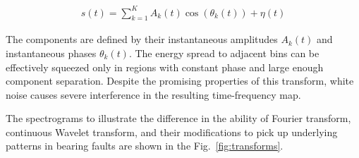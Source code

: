 \begin{ceqn}\begin{align}
s(t) = \sum_{k=1}^{K} A_k(t)\cos(\theta_k(t)) + \eta(t)
\label{equ:sst-transform}
\end{align}\end{ceqn}

The components are defined by their instantaneous amplitudes $A_k(t)$ and instantaneous phases $\theta_k(t)$. The energy spread to adjacent bins can be effectively squeezed only in regions with constant phase and large enough component separation. Despite the promising properties of this transform, white noise causes severe interference in the resulting time-frequency map.

The spectrograms to illustrate the difference in the ability of Fourier transform, continuous Wavelet transform, and their modifications to pick up underlying patterns in bearing faults are shown in the Fig.~\ref{fig:transforms}.

